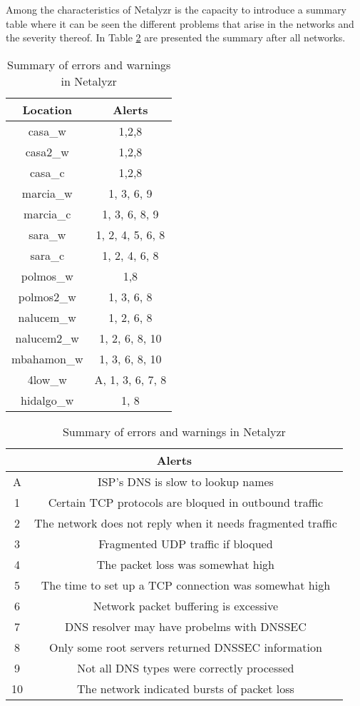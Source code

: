 Among the characteristics of Netalyzr is the capacity to introduce a summary
table where it can be seen the different problems that arise in the networks
and the severity thereof. In Table \ref{table:Errores} are presented the
summary after all networks.

\begin{table}
\centering
\caption[Netalyrz Test: Summary of errors and warnings in Netalyzr]{Summary of errors and warnings in Netalyzr}
\label{table:Errores}
\begin{tabular}{|c||c|}
 \hline
Location		& Alerts            \\ \hline \hline
casa\_w			& 1,2,8             \\ \hline
casa2\_w		& 1,2,8             \\ \hline
casa\_c			& 1,2,8 			\\ \hline
marcia\_w		& 1, 3, 6, 9 		\\ \hline
marcia\_c		& 1, 3, 6, 8, 9 	\\ \hline
sara\_w			& 1, 2, 4, 5, 6, 8 	\\ \hline
sara\_c			& 1, 2, 4, 6, 8 	\\ \hline
polmos\_w		& 1,8 				\\ \hline
polmos2\_w		& 1, 3, 6, 8 		\\ \hline
nalucem\_w		& 1, 2, 6, 8 		\\ \hline
nalucem2\_w		& 1, 2, 6, 8, 10 	\\ \hline
mbahamon\_w		& 1, 3, 6, 8, 10 	\\ \hline
4low\_w			& A, 1, 3, 6, 7, 8 	\\ \hline
hidalgo\_w		& 1, 8 				\\ \hline
\end{tabular}
\bigskip
{}
\begin{tabular}{|c||c|}
 \hline
 \multicolumn{2}{|c|}{Alerts} \\ \hline \hline
A	& ISP's DNS is slow to lookup names								\\ \hline
1	& Certain TCP protocols are bloqued in outbound traffic 		\\ \hline
2	& The network does not reply when it needs fragmented traffic 	\\ \hline
3	& Fragmented UDP traffic if bloqued 							\\ \hline
4	& The packet loss was somewhat high 							\\ \hline
5	& The time to set up a TCP connection was somewhat high 		\\ \hline
6	& Network packet buffering is excessive 						\\ \hline
7	& DNS resolver may have probelms with DNSSEC 					\\ \hline
8	& Only some root servers returned DNSSEC information 			\\ \hline
9	& Not all DNS types were correctly processed 					\\ \hline
10	& The network indicated bursts of packet loss 					\\ \hline
\end{tabular}
\end{table}

